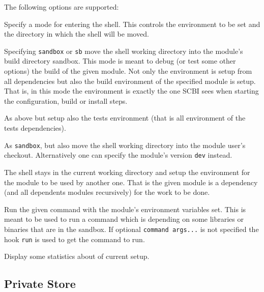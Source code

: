 \documentclass[a4paper,12pt,twoside]{article}
\newcommand{\code}[1]{\texttt{#1}}
\newcommand{\ddash}{-{}-}
\begin{document}
The following options are supported:

\begin{description}[font=\texttt]

	\item[\ddash{}mode:{[}dev|sandbox|sb|tests|use{]}] Specify a mode for entering the shell. This controls the environment to be set and the directory in which the shell will be moved.

	\begin{description}[font=\texttt]
		\item[sandbox] Specifying \code{sandbox} or \code{sb} move the shell working directory into the module's build directory sandbox. This mode is meant to debug (or test some other options) the build of the given module. Not only the environment is setup from all dependencies but also the build environment of the specified module is setup. That is, in this mode the environment is exactly the one SCBI sees when starting the configuration, build or install steps.

		\item[tests] As above but setup also the tests environment (that is all environment of the tests dependencies).

		\item[dev] As \code{sandbox}, but also move the shell working directory into the module user's checkout. Alternatively one can specify the module's version \code{dev} instead.

		\item[use|no sub-option] The shell stays in the current working directory and setup the environment for the module to be used by another one. That is the given module is a dependency (and all dependents modules recursively) for the work to be done.
	\end{description}

	\item[\ddash{}run{[}="command args..."{]}] \label{cmd!run}Run the given command with the module's environment variables set. This is meant to be used to run a command which is depending on some libraries or binaries that are in the sandbox. If optional \code{command args...} is not specified the hook \code{run} is used to get the command to run.

	\item[\ddash{}stat] Display some statistics about of current setup.
\end{description}

\subsection{Private Store}
\label{private store}
\label{store}
\end{document}
